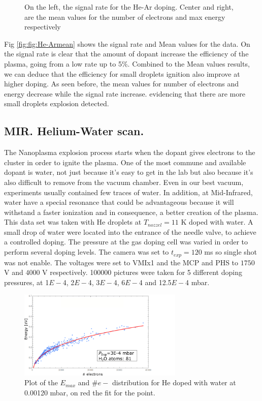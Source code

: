 \begin{figure}[h!]
\caption[MIR He-Ar doping, signal rate and histograms]{On the left, the signal rate for the He-Ar doping. Center and right, are the mean values for the number of electrons and max energy respectively}
\label{fig:He-Armean}
\end{figure}

Fig \ref{fig:fig:He-Armean} shows the signal rate and Mean values for the data. On the signal rate is clear that the amount of dopant increase the efficiency of the plasma, going from a low rate up to 5$\%$. Combined to the Mean values results, we can deduce that the efficiency for small droplets ignition also improve at higher doping. As seen before, the mean values for number of electrons and energy decrease while the signal rate increase. evidencing that there are more small droplets explosion detected.
  

\subsection{MIR. Helium-Water scan.}

The Nanoplasma explosion process starts when the dopant gives electrons to the cluster in order to ignite the plasma. One of the most commune and available dopant is water, not just because it’s easy to get in the lab but also because it’s also difficult to remove from the vacuum chamber. Even in our best vacuum, experiments usually contained few traces of water. In addition, at Mid-Infrared, water have a special resonance that could be advantageous because it will withstand a faster ionization and in consequence, a better creation of the plasma. This data set was taken with He droplets at $T_{nozzel}=11$ K doped with water. A small drop of water were located into the entrance of the needle valve, to achieve a controlled doping. The pressure at the gas doping cell was varied in order to perform several doping levels. The camera was set to $t_{exp}=120$ ms so single shot was not enable. The voltages were set to VMIx1 and the MCP and PHS to $1750$ V and $4000$ V respectively. 100000 pictures were taken for 5 different doping pressures, at 1$E-$4, 2$E-$4, 3$E-$4, 6$E-$4 and 12.5$E-$4 mbar. 

\begin{figure}[h!]

\centering
\includegraphics[width=0.7\textwidth]{../Images/results/MIR_He_waterDop/Energyfit.png}
\caption[He_h2O energy distribution]{Plot of the $E_{max}$ and $\#e-$ distribution for He doped with water at 0.00120 mbar, on red the fit for the point.}
\label{fig:He-waterEnergydistrib}
\end{figure}

